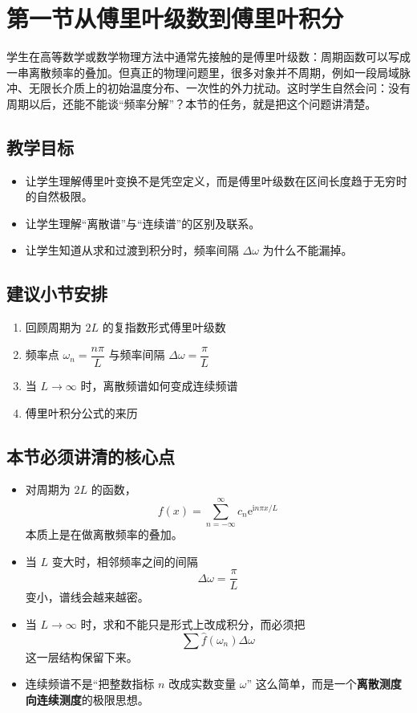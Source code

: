\section{第一节\quad 从傅里叶级数到傅里叶积分}

\begin{wulibj}[本节要解决的问题]
学生在高等数学或数学物理方法中通常先接触的是傅里叶级数：周期函数可以写成一串离散频率的叠加。但真正的物理问题里，很多对象并不周期，例如一段局域脉冲、无限长介质上的初始温度分布、一次性的外力扰动。这时学生自然会问：没有周期以后，还能不能谈``频率分解''？本节的任务，就是把这个问题讲清楚。
\end{wulibj}

\subsection*{教学目标}
\begin{itemize}
    \item 让学生理解傅里叶变换不是凭空定义，而是傅里叶级数在区间长度趋于无穷时的自然极限。
    \item 让学生理解``离散谱''与``连续谱''的区别及联系。
    \item 让学生知道从求和过渡到积分时，频率间隔 $\Delta\omega$ 为什么不能漏掉。
\end{itemize}

\subsection*{建议小节安排}
\begin{enumerate}
    \item 回顾周期为 $2L$ 的复指数形式傅里叶级数
    \item 频率点 $\omega_n = \dfrac{n\pi}{L}$ 与频率间隔 $\Delta\omega = \dfrac{\pi}{L}$
    \item 当 $L \to \infty$ 时，离散频谱如何变成连续频谱
    \item 傅里叶积分公式的来历
\end{enumerate}

\subsection*{本节必须讲清的核心点}
\begin{itemize}
    \item 对周期为 $2L$ 的函数，
    \[
        f(x)=\sum_{n=-\infty}^{\infty} c_n \mathrm{e}^{\mathrm{i}n\pi x/L}
    \]
    本质上是在做离散频率的叠加。
    \item 当 $L$ 变大时，相邻频率之间的间隔
    \[
        \Delta\omega=\frac{\pi}{L}
    \]
    变小，谱线会越来越密。
    \item 当 $L\to\infty$ 时，求和不能只是形式上改成积分，而必须把
    \[
        \sum \hat{f}(\omega_n)\Delta\omega
    \]
    这一层结构保留下来。
    \item 连续频谱不是``把整数指标 $n$ 改成实数变量 $\omega$'' 这么简单，而是一个\textbf{离散测度向连续测度}的极限思想。
\end{itemize}

